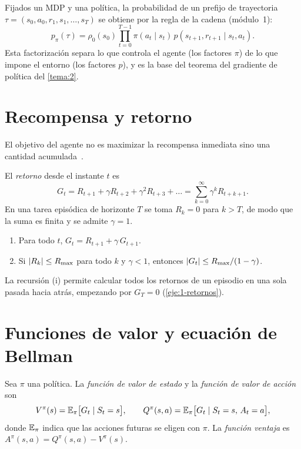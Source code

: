 Fijados un MDP y una política, la probabilidad de un prefijo de trayectoria $\tau=(s_0,a_0,r_1,s_1,\dots,s_T)$ se obtiene por la regla de la cadena (módulo~1):
\begin{equation}\label{eq:ptau}
p_\pi(\tau)=\rho_0(s_0)\prod_{t=0}^{T-1}\pi(a_t\mid s_t)\,p(s_{t+1},r_{t+1}\mid s_t,a_t).
\end{equation}
Esta factorización separa lo que controla el agente (los factores $\pi$) de lo que impone el entorno (los factores $p$), y es la base del teorema del gradiente de política del \cref{tema:2}.

\section{Recompensa y retorno}

El objetivo del agente no es maximizar la recompensa inmediata sino una cantidad acumulada~\cite[cap.~3]{sb}.

\begin{definicion}[Retorno]\label{def:retorno}
El \emph{retorno} desde el instante $t$ es
\[
G_t=R_{t+1}+\gamma R_{t+2}+\gamma^{2}R_{t+3}+\dots=\sum_{k=0}^{\infty}\gamma^{k}R_{t+k+1}.
\]
En una tarea episódica de horizonte $T$ se toma $R_k=0$ para $k>T$, de modo que la suma es finita y se admite $\gamma=1$.
\end{definicion}

\begin{proposicion}\label{prop:retorno}
\begin{enumerate}
  \item Para todo $t$, $G_t=R_{t+1}+\gamma\,G_{t+1}$.
  \item Si $\lvert R_k\rvert\le R_{\max}$ para todo $k$ y $\gamma<1$, entonces $\lvert G_t\rvert\le R_{\max}/(1-\gamma)$.
\end{enumerate}
\end{proposicion}

La recursión (i) permite calcular todos los retornos de un episodio en una sola pasada hacia atrás, empezando por $G_T=0$ (\cref{eje:1-retornos}).

\section{Funciones de valor y ecuación de Bellman}

\begin{definicion}\label{def:valor}
Sea $\pi$ una política. La \emph{función de valor de estado} y la \emph{función de valor de acción} son
\[
V^{\pi}(s)=\mathbb{E}_{\pi}\bigl[G_t\mid S_t=s\bigr],\qquad Q^{\pi}(s,a)=\mathbb{E}_{\pi}\bigl[G_t\mid S_t=s,\,A_t=a\bigr],
\]
donde $\mathbb{E}_\pi$ indica que las acciones futuras se eligen con $\pi$. La \emph{función ventaja} es $A^{\pi}(s,a)=Q^{\pi}(s,a)-V^{\pi}(s)$.
\end{definicion}

